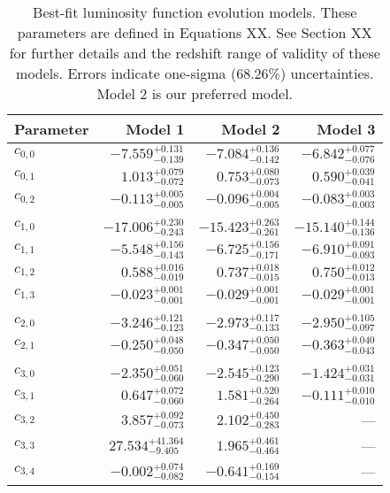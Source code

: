 \documentclass[a4paper,fleqn,usenatbib]{mnras}
\begin{document}
\begin{table}
  \caption{Best-fit luminosity function evolution models.  These
    parameters are defined in Equations XX.  See Section XX for
    further details and the redshift range of validity of these
    models.  Errors indicate one-sigma (68.26\%) uncertainties.  Model
    2 is our preferred model.}
  \label{tab:global}
  \begin{tabular}{lrrr}
    \hline 
    Parameter & Model 1 & Model 2 & Model 3 \\
    \hline
    $c_{0,0}$ & $-7.559^{+0.131}_{-0.139}$ & $-7.084^{+0.136}_{-0.142}$ & $-6.842^{+0.077}_{-0.076}$ \\     
    $c_{0,1}$ & $1.013^{+0.079}_{-0.072}$ & $0.753^{+0.080}_{-0.073}$ & $0.590^{+0.039}_{-0.041}$ \\        
    $c_{0,2}$ & $-0.113^{+0.005}_{-0.005}$ & $-0.096^{+0.004}_{-0.005}$ & $-0.083^{+0.003}_{-0.003}$ \\
    \\
    $c_{1,0}$ & $-17.006^{+0.230}_{-0.243}$ & $-15.423^{+0.263}_{-0.261}$ & $-15.140^{+0.144}_{-0.136}$ \\  
    $c_{1,1}$ & $-5.548^{+0.156}_{-0.143}$ & $-6.725^{+0.156}_{-0.171}$ & $-6.910^{+0.091}_{-0.093}$ \\     
    $c_{1,2}$ & $0.588^{+0.016}_{-0.019}$ & $0.737^{+0.018}_{-0.015}$ & $0.750^{+0.012}_{-0.013}$ \\        
    $c_{1,3}$ & $-0.023^{+0.001}_{-0.001}$ & $-0.029^{+0.001}_{-0.001}$ & $-0.029^{+0.001}_{-0.001}$ \\
    \\
    $c_{2,0}$ & $-3.246^{+0.121}_{-0.123}$ & $-2.973^{+0.117}_{-0.133}$ & $-2.950^{+0.105}_{-0.097}$ \\     
    $c_{2,1}$ & $-0.250^{+0.048}_{-0.050}$ & $-0.347^{+0.050}_{-0.050}$ & $-0.363^{+0.040}_{-0.043}$ \\
    \\
    $c_{3,0}$ & $-2.350^{+0.051}_{-0.060}$ & $-2.545^{+0.123}_{-0.290}$ & $-1.424^{+0.031}_{-0.031}$ \\     
    $c_{3,1}$ & $0.647^{+0.072}_{-0.060}$ & $1.581^{+0.520}_{-0.264}$ & $-0.111^{+0.010}_{-0.010}$ \\       
    $c_{3,2}$ & $3.857^{+0.092}_{-0.073}$ & $2.102^{+0.450}_{-0.283}$ & --- \\        
    $c_{3,3}$ & $27.534^{+41.364}_{-9.405}$ & $1.965^{+0.461}_{-0.464}$ & --- \\      
    $c_{3,4}$ & $-0.002^{+0.074}_{-0.082}$ & $-0.641^{+0.169}_{-0.154}$ & --- \\      
    \hline 
  \end{tabular}
\end{table}
\end{document}
